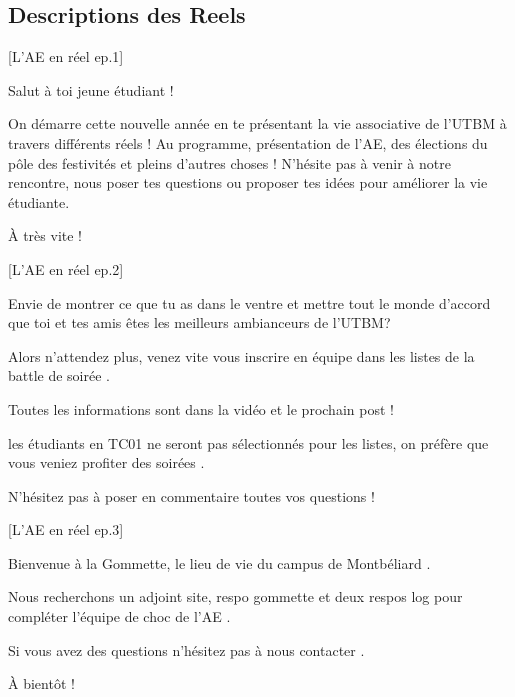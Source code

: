 


\subsection*{Descriptions des Reels}\label{subsec:descriptions-reels}



[L'\gls{AE} en réel ep.1]

\noindent Salut à toi jeune étudiant !

\noindent On démarre cette nouvelle année en te présentant la vie associative de l'\gls{UTBM} à travers différents réels !
\noindent Au programme, présentation de l'\gls{AE}, des élections du pôle des festivités et pleins d'autres choses !
\noindent N'hésite pas à venir à notre rencontre, nous poser tes questions ou proposer tes idées pour améliorer la vie étudiante.

\noindent À très vite !


[L'\gls{AE} en réel ep.2]

\noindent Envie de montrer ce que tu as dans le ventre et mettre tout le monde d'accord que toi et tes amis êtes les meilleurs ambianceurs de l'\gls{UTBM}? 

\noindent Alors n'attendez plus, venez vite vous inscrire en équipe dans les listes de la battle de soirée .

\noindent Toutes les informations sont dans la vidéo et le prochain post  !

\noindent {} les étudiants en TC01 ne seront pas sélectionnés pour les listes, on préfère que vous veniez profiter des soirées .

\noindent N'hésitez pas à poser en commentaire toutes vos questions !


[L'\gls{AE} en réel ep.3]

\noindent Bienvenue à la Gommette, le lieu de vie du campus de Montbéliard .

\noindent Nous recherchons un adjoint site, respo gommette et deux respos log pour compléter l'équipe de choc de l'\gls{AE} .

\noindent Si vous avez des questions n'hésitez pas à nous contacter .

\noindent À bientôt  !




